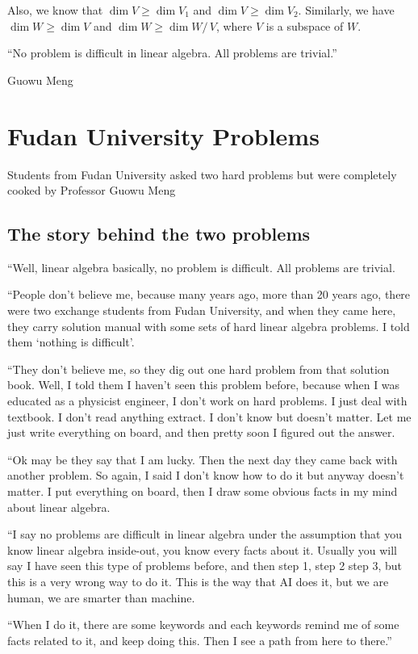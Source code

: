 \documentclass[
	11pt, %
	fleqn, %
	a4paper, %
]{LegrandOrangeBook}
\newcommand{\quotient}[2]{#1 /\, #2} %
\begin{document}
Also, we know that $\dim{V} \geq \dim{V_1}$ and $\dim{V} \geq \dim{V_2}$. Similarly, we have $\dim{W} \geq \dim{V}$ and $\dim{W} \geq \dim{\quotient{W}{V}}$, where $V$ is a subspace of $W$.

\newpage

\epigraph{``No problem is difficult in linear algebra. All problems are trivial.''}{Guowu Meng}

\section{Fudan University Problems}

Students from Fudan University asked two hard problems but were completely cooked by Professor Guowu Meng

\subsection{The story behind the two problems}
``Well, linear algebra basically, no problem is difficult. All problems are trivial. 

``People don't believe me, because many years ago, more than 20 years ago, there were two exchange students from Fudan University, and when they came here, they carry solution manual with some sets of hard linear algebra problems. I told them `nothing is difficult'. 

``They don't believe me, so they dig out one hard problem from that solution book. Well, I told them I haven't seen this problem before, because when I was educated as a physicist engineer, I don't work on hard problems. I just deal with textbook. I don't read anything extract. I don't know but doesn't matter. Let me just write everything on board, and then pretty soon I figured out the answer. 

``Ok may be they say that I am lucky. Then the next day they came back with another problem. So again, I said I don't know how to do it but anyway doesn't matter. I put everything on board, then I draw some obvious facts in my mind about linear algebra. 

``I say no problems are difficult in linear algebra under the assumption that you know linear algebra inside-out, you know every facts about it. Usually you will say I have seen this type of problems before, and then step 1, step 2 step 3, but this is a very wrong way to do it. This is the way that AI does it, but we are human, we are smarter than machine. 

``When I do it, there are some keywords and each keywords remind me of some facts related to it, and keep doing this. Then I see a path from here to there.'' 
\end{document}
